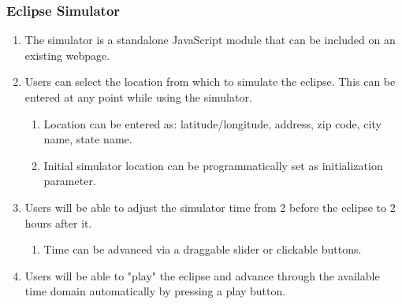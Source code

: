 \documentclass[10pt, onecolumn, draftclsnofoot, letterpaper, compsoc]{IEEEtran}
\begin{document}
\subsubsection{Eclipse Simulator}
	\begin{enumerate}
		\item The simulator is a standalone JavaScript module that can
		be included on an existing webpage.

		\item Users can select the location from which to simulate the eclipse.
		This can be entered at any point while using the simulator.
		\begin{enumerate}
			\item Location can be entered as: latitude/longitude, address, zip code,
			city name, state name.
			\item Initial simulator location can be programmatically set as
			initialization parameter.
		\end{enumerate}

		\item Users will be able to adjust the simulator time from 2 before
		the eclipse to 2 hours after it.
		\begin{enumerate}
			\item Time can be advanced via a draggable slider or clickable buttons.
		\end{enumerate}

        \item Users will be able to "play" the eclipse and advance through the available time
        domain automatically by pressing a play button.

	\end{enumerate}
\end{document}
